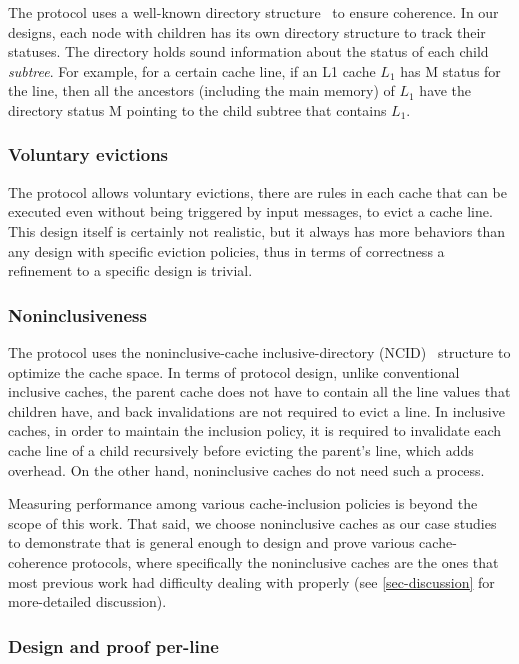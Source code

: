 \documentclass[sigplan,10pt,review,anonymous,screen]{acmart}\settopmatter{printfolios=true,printccs=false,printacmref=false}
\begin{document}
The protocol uses a well-known directory structure~\cite{Tang:1976} to ensure coherence.
In our designs, each node with children has its own directory structure to track their statuses.
The directory holds sound information about the status of each child \emph{subtree}.
For example, for a certain cache line, if an L1 cache $L_1$ has M status for the line, then all the ancestors (including the main memory) of $L_1$ have the directory status M pointing to the child subtree that contains $L_1$.

\subsubsection{Voluntary evictions}

The protocol allows voluntary evictions, \ie{} there are rules in each cache that can be executed even without being triggered by input messages, to evict a cache line.
This design itself is certainly not realistic, but it always has more behaviors than any design with specific eviction policies, thus in terms of correctness a refinement to a specific design is trivial.

\subsubsection{Noninclusiveness}
\label{sec-noninclusive}

The protocol uses the noninclusive-cache inclusive-directory (NCID)~\cite{Zhao:2010} structure to optimize the cache space.
In terms of protocol design, unlike conventional inclusive caches, the parent cache does not have to contain all the line values that children have, and back invalidations are not required to evict a line.
In inclusive caches, in order to maintain the inclusion policy, it is required to invalidate each cache line of a child recursively before evicting the parent's line, which adds overhead.
On the other hand, noninclusive caches do not need such a process.

Measuring performance among various cache-inclusion policies is beyond the scope of this work.
That said, we choose noninclusive caches as our case studies to demonstrate that \hemiola{} is general enough to design and prove various cache-coherence protocols, where specifically the noninclusive caches are the ones that most previous work had difficulty dealing with properly (see \autoref{sec-discussion} for more-detailed discussion).

\subsubsection{Design and proof per-line}
\label{sec-design-line}
\end{document}
